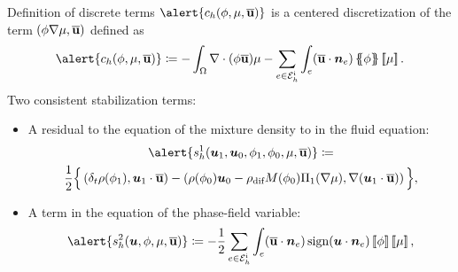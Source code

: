 \begin{frame}{Definition of discrete terms}
  \small
  $\alert{\ch{\phi}{\mu}{\buu}}$ is a centered discretization of the term $\left(\phi\nabla\mu,\overline{\mathbf{u}}\right)$
  defined as
  \begin{equation*}
      \alert{\ch{\phi}{\mu}{\buu}}\coloneqq 
      - \int_\Omega\nabla\cdot(\phi\buu) \mu
      -\sum_{e\in\Ehi}\int_e (\buu\cdot\nn_e)\media{\phi}\salto{\mu}.
  \end{equation*}
  \pause
  Two consistent stabilization terms:
  \begin{itemize}
      \item A residual to the equation of the mixture density to  in the fluid equation:
  \begin{multline*}
      \alert{\th{\uu_1}{\uu_0}{\phi_1}{\phi_0}{\mu}{\buu}}\coloneqq 
      \\\frac{1}{2}\Big\{\escalarL{\delta_t\rho(\phi_1)}{\uu_1\cdot \buu}-\escalarLd{\rho(\phi_0)\uu_0-\rho_\text{dif}M(\phi_0)\Pi_1(\nabla\mu)}{\nabla(\uu_1\cdot \buu)}\Big\},
  \end{multline*}
  \pause
  \item A term  in the equation of the phase-field variable:
  \begin{equation*}
      \alert{\sh{\uu}{\phi}{\mu}{\buu}}\coloneqq
      -\frac{1}{2}\sum_{e\in\Ehi}\int_e(\buu\cdot\nn_e)\, \sign{\uu\cdot\nn_e}\salto{\phi}\salto{\mu},
  \end{equation*}
  \end{itemize}
\end{frame}

